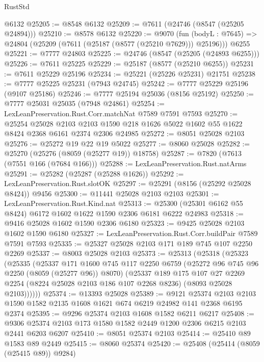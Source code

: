 \begin{lexlean}{RustStd}
\begin{coremodule}
{\begin{coremodule}
{{{{{{{{{{{{{{{{{{{{{{{{{{{{{{{{{{    @6132
@25205 := @8548 @6132
@25209 := @7611 (@24746 (@8547 (@25205 @24894)))
@25210 := @8578 @6132
@25220 := @9070
    (fun (bodyL : @7645) => @24804 (@25209 (@7611 (@25187 (@8577 (@25210 @7629))) @25196)))
    @6255
@25221 := @7777 @24803
@25225 := @24746 (@8547 (@25205 (@24893 @6255)))
@25226 := @7611 @25225
@25229 := @25187 (@8577 (@25210 @6255))
@25231 := @7611 @25229 @25196
@25234 := @25221 (@25226 @25231) @21751
@25238 := @7777 @25225 @25231 (@7943 @24745)
@25242 := @7777 @25229 @25196 (@9107 @25186)
@25246 := @7777 @25194 @25036 (@8156 @25192)
@25250 := @7777 @25031 @25035 (@7948 @24861)
@25254 := LexLeanPreservation.Rust.Corr.matchNat @7589 @7591 @7593
@25270 := @25254
    @25028
    @2103
    @2103
    @1590
    @218
    @1626
    @5022
    @1602
    @55
    @1622
    @8424
    @2368
    @6161
    @2374
    @2306
    @24985
@25272 := @8051 @25028 @2103
@25276 := @25272 @19 @22 @19 @5022
@25277 := @8060 @25028
@25282 := @25270 (@25276 (@8059 (@25277 @19)) @18758)
@25287 := @7820 (@7613 (@7551 @166 (@7684 @166)))
@25288 := LexLeanPreservation.Rust.natArms
@25291 := @25282 (@25287 (@25288 @1626))
@25292 := LexLeanPreservation.Rust.slotOK
@25297 := @25291 (@8156 (@25292 @25028 @8424)) @9456
@25300 := @11441 @25028 @2103 @2103
@25301 := LexLeanPreservation.Rust.Kind.nat
@25313 := @25300 (@25301 @6162 @55 @8424) @6172 @1602 @1622 @1590 @2306 @6181 @6222 @24983
@25318 := @9416 @25028 @1602 @1590 @2306 @6180
@25323 := @9425 @25028 @2103 @1602 @1590 @6180
@25327 := LexLeanPreservation.Rust.Corr.buildPair @7589 @7591 @7593
@25335 := @25327 @25028 @2103 @171 @189 @745 @107 @2250 @2269
@25337 := @8003 @25028 @2103
@25373 := @25313
    (@25318
      (@25323
        (@25335
          (@25337
            @171
            @1600
            @745
            @117
            @2250
            @6759
            (@25272 @96 @745 @96 @2250 (@8059 (@25277 @96)) @8070)
            (@25337
              @189
              @175
              @107
              @27
              @2269
              @2254
              (@8224 @25028 @2103 @186 @107 @2268 @8236)
              (@8093 @25028 @2103))))))
@25374 := @13393 @25028
@25389 := @9121
    @25374
    @2103
    @2103
    @1590
    @1582
    @2135
    @1608
    @1621
    @674
    @6219
    @24982
    @141
    @2368
    @6195
    @2374
@25395 := @9296 @25374 @2103 @1608 @1582 @6211 @6217
@25408 := @9306 @25374 @2103 @173 @1580 @1582 @2449 @1200 @2306 @6215 @2103 @2441 @6203 @6207
@25410 := @8051 @25374 @2103
@25414 := @25410 @89 @1583 @89 @2449
@25415 := @8060 @25374
@25420 := @25408 (@25414 (@8059 (@25415 @89)) @9284)
}}}}}}}}}}}}}}}}}}}}}}}}}}}}}}}}}}
\end{coremodule}}
\end{coremodule}
\end{lexlean}
